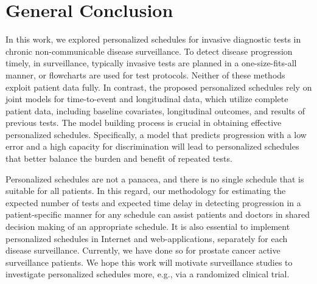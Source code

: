 \section{General Conclusion}
\label{c7:sec:conclusion}
In this work, we explored personalized schedules for invasive diagnostic tests in chronic non-communicable disease surveillance. To detect disease progression timely, in surveillance, typically invasive tests are planned in a one-size-fits-all manner, or flowcharts are used for test protocols. Neither of these methods exploit patient data fully. In contrast, the proposed personalized schedules rely on joint models for time-to-event and longitudinal data, which utilize complete patient data, including baseline covariates, longitudinal outcomes, and results of previous tests. The model building process is crucial in obtaining effective personalized schedules. Specifically, a model that predicts progression with a low error and a high capacity for discrimination will lead to personalized schedules that better balance the burden and benefit of repeated tests. 

Personalized schedules are not a panacea, and there is no single schedule that is suitable for all patients. In this regard, our methodology for estimating the expected number of tests and expected time delay in detecting progression in a patient-specific manner for any schedule can assist patients and doctors in shared decision making of an appropriate schedule. It is also essential to implement personalized schedules in Internet and web-applications, separately for each disease surveillance. Currently, we have done so for prostate cancer active surveillance patients. We hope this work will motivate surveillance studies to investigate personalized schedules more, e.g., via a randomized clinical trial.